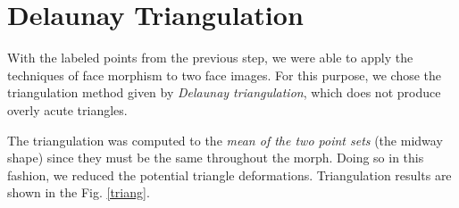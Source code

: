 \documentclass[11pt]{article}
\begin{document}
\newpage



\section{Delaunay Triangulation}

With the labeled points from the previous step, we were able to apply the techniques of face morphism to two face images. For this purpose, we chose the triangulation method given by {\it Delaunay triangulation}, which  does not produce overly acute triangles. 

\quad

The triangulation was computed to the {\it mean of the two point sets} (the midway shape) since they must be the same throughout the morph. Doing so in this fashion, we reduced the potential triangle deformations. Triangulation results are shown in the Fig. \ref{triang}.

\quad
\end{document}
